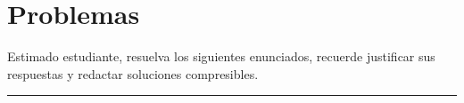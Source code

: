 \section*{Problemas}

Estimado estudiante, resuelva los siguientes enunciados, recuerde justificar sus respuestas y redactar soluciones compresibles.

\begin{exercise*}
\end{exercise*}

\begin{problem*}
\end{problem*}

\hrule